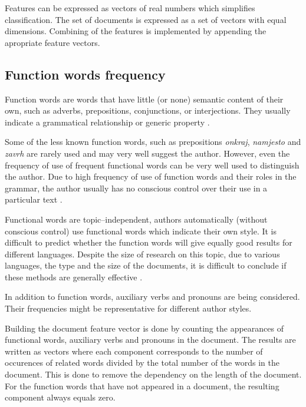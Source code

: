 \documentclass[11pt,english]{article}
\begin{document}
\begin{multicols}{2}
Features can be expressed as vectors of real numbers which simplifies
classification. The set of documents is expressed as a set of vectors with equal dimensions.
Combining of the features is implemented by appending the apropriate feature
vectors.



\subsection{Function words frequency}
\label{sec:funkcijske-rijeci}
Function words are words that have little (or none) semantic content of their
own, such as adverbs, prepositions, conjunctions, or interjections. They usually
indicate a grammatical relationship or generic property
\citep{zhao2005effective}.

Some of the less known function words, such as prepositions \emph{onkraj},
\emph{namjesto} and \emph{zavrh} are rarely used and may very well suggest the
author. However, even the frequency of use of frequent functional words can be
very well used to distinguish the author. Due to high frequency of use of
function words and their roles in the grammar, the author usually has no
conscious control over their use in a particular text
\citep{argamon2005measuring}.

Functional words are topic--independent, authors automatically (without conscious
control) use functional words which indicate their own style.
It is difficult to predict whether the function words will give equally good
results for different languages. Despite the size of research on this
topic, due to various languages, the type and the size of the documents, it is difficult to
conclude if these methods are generally effective \citep{zhao2005effective}.

In addition to function words, auxiliary verbs and pronouns are being
considered. Their frequencies might be representative for different
author styles.

Building the document feature vector is done by counting the appearances
of functional words, auxiliary verbs and pronouns in the document. The results
are written as vectors where each component corresponds to the number of occurences of
related words divided by the total number of the words in the document. This is done to remove
the dependency on the length of the document. For the function words that have not
appeared in a document, the resulting component always equals zero.


\end{multicols}
\end{document}
